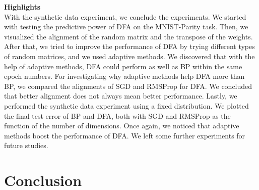 \documentclass[a4paper, nobind]{templates/ociamthesis}
\begin{document}
\noindent \textbf{Highlights}\\
With the synthetic data experiment, we conclude the experiments. We started with testing the predictive power of DFA on the MNIST-Parity task. Then, we visualized the alignment of the random matrix and the transpose of the weights. After that, we tried to improve the performance of DFA by trying different types of random matrices, and we used adaptive methods. We discovered that with the help of adaptive methods, DFA could perform as well as BP within the same epoch numbers. For investigating why adaptive methods help DFA more than BP, we compared the alignments of SGD and RMSProp for DFA. We concluded that better alignment does not always mean better performance. Lastly, we performed the synthetic data experiment using a fixed distribution. We plotted the final test error of BP and DFA, both with SGD and RMSProp as the function of the number of dimensions. Once again, we noticed that adaptive methods boost the performance of DFA. We left some further experiments for future studies.

\hypertarget{conc}{%
\chapter*{Conclusion}\label{conc}}
\end{document}
